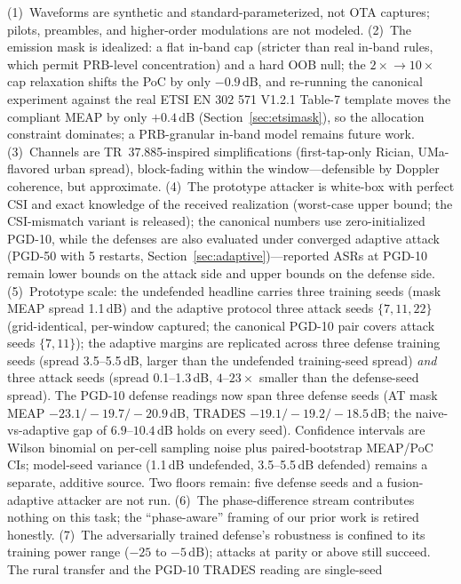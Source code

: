 \documentclass[review]{elsarticle}
\begin{document}
(1)~Waveforms are synthetic and standard-parameterized, not OTA captures;
pilots, preambles, and higher-order modulations are not modeled.
(2)~The emission mask is idealized: a flat in-band cap (stricter than real
in-band rules, which permit PRB-level concentration) and a hard OOB null;
the $2\times\!\to\!10\times$ cap relaxation shifts the PoC by only
$-0.9$\,dB, and re-running the canonical experiment against the real
ETSI EN 302 571 V1.2.1 Table-7 template moves the compliant MEAP by only
$+0.4$\,dB (Section~\ref{sec:etsimask}), so the allocation constraint
dominates; a PRB-granular in-band model remains future work.
(3)~Channels are TR~37.885-inspired simplifications (first-tap-only Rician,
UMa-flavored urban spread), block-fading within the window---defensible by
Doppler coherence, but approximate.
(4)~The prototype attacker is white-box with perfect CSI and exact knowledge
of the received realization (worst-case upper bound; the CSI-mismatch
variant is released); the canonical numbers use zero-initialized PGD-10,
while the defenses are also evaluated under converged adaptive
attack (PGD-50 with 5 restarts, Section~\ref{sec:adaptive})---reported
ASRs at PGD-10 remain lower bounds on the attack side and upper bounds on
the defense side.
(5)~Prototype scale: the undefended headline carries three training seeds
(mask MEAP spread 1.1\,dB) and the adaptive protocol three attack seeds
$\{7,11,22\}$ (grid-identical, per-window captured; the canonical PGD-10
pair covers attack seeds $\{7,11\}$); the adaptive margins are replicated
across three defense training seeds (spread 3.5--5.5\,dB, larger than the
undefended training-seed spread) \emph{and} three attack seeds (spread
0.1--1.3\,dB, $4$--$23\times$ smaller than the defense-seed spread). The
PGD-10 defense readings now span three defense seeds (AT mask MEAP
$-23.1/-19.7/-20.9$\,dB, TRADES $-19.1/-19.2/-18.5$\,dB; the
naive-vs-adaptive gap of $6.9$--$10.4$\,dB holds on every seed).
Confidence intervals are Wilson binomial on per-cell sampling noise plus
paired-bootstrap MEAP/PoC CIs; model-seed variance (1.1\,dB undefended,
3.5--5.5\,dB defended) remains a separate, additive source. Two floors
remain: five defense seeds and a fusion-adaptive attacker are not run.
(6)~The phase-difference stream contributes nothing on this task; the
``phase-aware'' framing of our prior work is retired honestly.
(7)~The adversarially trained defense's robustness is confined to its
training power range ($-25$ to $-5$\,dB); attacks at parity or above still
succeed. The rural transfer and the PGD-10 TRADES reading are single-seed
\end{document}
